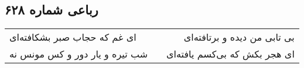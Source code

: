 \begin{center}
\section*{رباعی شماره ۶۲۸}
\label{sec:sh628}
\begin{longtable}{l p{0.5cm} r}
ای غم که حجاب صبر بشکافته‌ای
&&
بی تابی من دیده و برتافته‌ای
\\
شب تیره و یار دور و کس مونس نه
&&
ای هجر بکش که بی‌کسم یافته‌ای
\\
\end{longtable}
\end{center}
